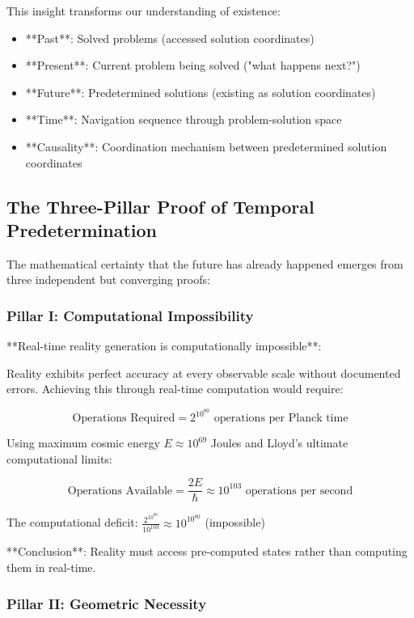 \documentclass[12pt,a4paper]{article}
\begin{document}
This insight transforms our understanding of existence:
\begin{itemize}
\item **Past**: Solved problems (accessed solution coordinates)
\item **Present**: Current problem being solved ("what happens next?")
\item **Future**: Predetermined solutions (existing as solution coordinates)
\item **Time**: Navigation sequence through problem-solution space
\item **Causality**: Coordination mechanism between predetermined solution coordinates
\end{itemize}

\subsection{The Three-Pillar Proof of Temporal Predetermination}

The mathematical certainty that the future has already happened emerges from three independent but converging proofs:

\subsubsection{Pillar I: Computational Impossibility}

**Real-time reality generation is computationally impossible**:

Reality exhibits perfect accuracy at every observable scale without documented errors. Achieving this through real-time computation would require:

$$\text{Operations Required} = 2^{10^{80}} \text{ operations per Planck time}$$

Using maximum cosmic energy $E \approx 10^{69}$ Joules and Lloyd's ultimate computational limits:

$$\text{Operations Available} = \frac{2E}{\hbar} \approx 10^{103} \text{ operations per second}$$

The computational deficit: $\frac{2^{10^{80}}}{10^{103}} \approx 10^{10^{80}}$ (impossible)

**Conclusion**: Reality must access pre-computed states rather than computing them in real-time.

\subsubsection{Pillar II: Geometric Necessity}
\end{document}
